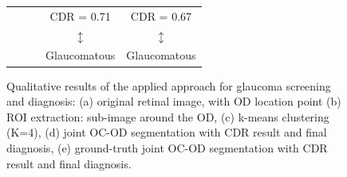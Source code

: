 \begin{figure}[!htbp]
\begin{tabular}{|c c c c c|}
{} & {} & {} & CDR = 0.71 & CDR = 0.67 \\
{} & {} & {} & $\updownarrow$ & $\updownarrow$ \\
{} & {} & {} & Glaucomatous & Glaucomatous \\

\hline
\end{tabular}

\caption{\label{results}Qualitative results of the applied approach for glaucoma screening and diagnosis: (a) original retinal image, with OD location point (b) ROI extraction: sub-image around the OD, (c) k-means clustering (K=4), (d) joint OC-OD segmentation with CDR result and final diagnosis, (e) ground-truth joint OC-OD segmentation with CDR result and final diagnosis.}
\end{figure}
